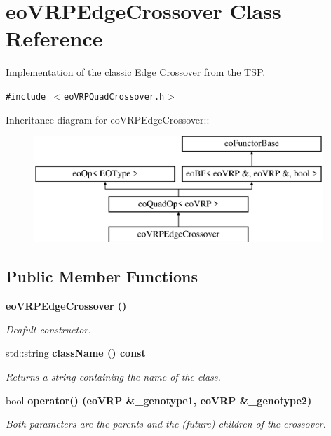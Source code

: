 \section{eo\-VRPEdge\-Crossover Class Reference}
\label{classeo_v_r_p_edge_crossover}
Implementation of the classic Edge Crossover from the TSP.  


{\tt \#include $<$eo\-VRPQuad\-Crossover.h$>$}

Inheritance diagram for eo\-VRPEdge\-Crossover::\begin{figure}[H]
\begin{center}
\leavevmode
\includegraphics[height=4cm]{classeo_v_r_p_edge_crossover}
\end{center}
\end{figure}
\subsection*{Public Member Functions}
\begin{CompactItemize}
\item 
\bf{eo\-VRPEdge\-Crossover} ()\label{classeo_v_r_p_edge_crossover_1cec73fc43837a61b6c97812dd57891b}

\begin{CompactList}\small\item\em Deafult constructor. \item\end{CompactList}\item 
std::string \bf{class\-Name} () const 
\begin{CompactList}\small\item\em Returns a string containing the name of the class. \item\end{CompactList}\item 
bool \bf{operator()} (\bf{eo\-VRP} \&\_\-genotype1, \bf{eo\-VRP} \&\_\-genotype2)
\begin{CompactList}\small\item\em Both parameters are the parents and the (future) children of the crossover. \item\end{CompactList}\end{CompactItemize}
